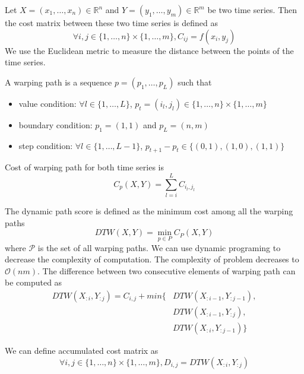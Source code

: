 \documentclass[thesis=M,english]{FITthesis}[2019/12/23]
\begin{document}
\noindent Let $X = (x_1, \dots, x_n)\in \mathbb{R}^n$ and $Y = (y_1, \dots, y_m) \in \mathbb{R}^m$ be two time series.
Then the cost matrix between these two time series is defined as
\begin{equation*}
    \forall i,j \in \{1,\dots,n\} \times \{1,\dots,m\}, C_{ij} = f(x_i,y_j)
\end{equation*}
We use the Euclidean metric to measure the distance between the points of the time series.

\noindent A warping path is a sequence $p = (p_1,\dots, p_L)$ such that
\begin{itemize}
		\item value condition: $\forall l \in \{1, \dots ,L\}$, $p_t = ( i_l,j_l) \in \{1,\dots,n\} \times \{1,\dots,m\}$  
		\item boundary condition: $p_1 = (1,1)$ and $ p_L = (n,m)$
		\item step condition: $\forall l \in \{1, \dots ,L - 1\}$, $p_{t+1} - p_t \in  \{(0,1), (1,0), (1,1)\}$
	\end{itemize}

Cost of warping path for both time series is
\begin{equation*}
    C_p(X,Y) = \sum_{l=i}^{L}C_{i_l,j_l}
\end{equation*}

The dynamic path score is defined as the minimum cost among all the warping paths
\begin{equation*}
    DTW(X,Y) = \min_{p \in P} C_P(X,Y)
\end{equation*}
where $\mathcal{P}$ is the set of all warping paths. We can use dynamic programing to decrease the complexity of computation. The complexity of problem decreases to $\mathcal{O}(nm)$. The difference between two consecutive elements of warping path can be computed as
\begin{equation*}
\begin{split}
    DTW(X_{:i},Y_{:j}) = C_{i,j} + min\{ & DTW(X_{:i-1},Y_{:j-1}), \\ 
    & DTW(X_{:i-1},Y_{:j}), \\ 
    & DTW(X_{:i},Y_{:j-1})\}
\end{split}
\end{equation*}

\noindent We can define accumulated cost matrix as
\begin{equation*}
\forall i,j \in \{1,\dots,n\}\times\{1,\dots,m\}, D_{i,j} = DTW(X_{:i},Y_{:j})
\end{equation*}
\end{document}
